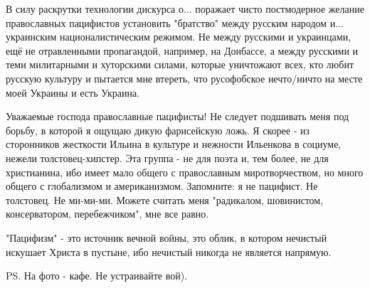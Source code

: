 В силу раскрутки технологии дискурса о... поражает чисто постмодерное желание
православных пацифистов установить "братство" между русским народом и...
украинским националистическим режимом. Не между русскими и украинцами, ещё не
отравленными пропагандой, например, на Донбассе, а между русскими и теми
милитарными и хуторскими силами, которые уничтожают всех, кто любит русскую
культуру и пытается мне втереть, что русофобское нечто/ничто на месте моей
Украины и есть Украина.

Уважаемые господа православные пацифисты! Не следует подшивать меня под борьбу,
в которой я ощущаю дикую фарисейскую ложь. Я скорее - из сторонников жесткости
Ильина в культуре и нежности Ильенкова в социуме, нежели толстовец-хипстер. Эта
группа - не для поэта и, тем более, не для христианина, ибо имеет мало общего с
православным миротворчеством, но много общего с глобализмом и американизмом.
Запомните: я не пацифист. Не толстовец. Не ми-ми-ми. Можете считать меня
"радикалом, шовинистом, консерватором, перебежчиком", мне все равно. 

"Пацифизм" - это источник вечной войны, это облик, в котором нечистый искушает
Христа в пустыне, ибо нечистый никогда не является напрямую.

PS. На фото - кафе. Не устраивайте вой).

